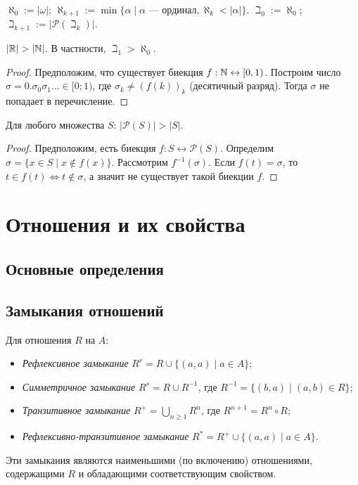 \documentclass[10pt]{article}
\begin{document}
\begin{definition}
$\aleph_0 := |\omega|$; $\aleph_{k+1} := \min\{ \alpha \mid \alpha \text{ — ординал}, \aleph_k < |\alpha| \}$.
$\beth_0 := \aleph_0$; $\beth_{k+1} := |\mathcal{P}(\beth_k)|$.
\end{definition}

\begin{theorem}
$|\mathbb{R}| > |\mathbb{N}|$. В частности, $\beth_1 > \aleph_0$.
\end{theorem}
\begin{proof}
Предположим, что существует биекция $f : \mathbb{N} \leftrightarrow [0,1)$. Построим число $\sigma = 0.\sigma_0\sigma_1\dots \in [0; 1)$, где $\sigma_k \ne (f(k))_k$ (десятичный разряд). Тогда $\sigma$ не попадает в перечисление.
\end{proof}

\begin{theorem}[Кантора]
Для любого множества $S$: $|\mathcal{P}(S)| > |S|$.
\end{theorem}
\begin{proof}
Предположим, есть биекция $f: S \leftrightarrow \mathcal{P}(S)$. Определим $\sigma = \{ x \in S \mid x \notin f(x) \}$. Рассмотрим $f^{-1}(\sigma)$. Если $f(t) = \sigma$, то $t \in f(t) \iff t \notin \sigma$, а значит не существует такой биекции $f$.
\end{proof}

\section{Отношения и их свойства}
\subsection{Основные определения}

\subsection{Замыкания отношений}
\begin{definition}
Для отношения $R$ на $A$:
\begin{itemize}
    \item \emph{Рефлексивное замыкание} $R^r = R \cup \{ (a,a) \mid a \in A \}$;
    \item \emph{Симметричное замыкание} $R^s = R \cup R^{-1}$, где $R^{-1} = \{ (b,a) \mid (a,b) \in R \}$;
    \item \emph{Транзитивное замыкание} $R^+ = \bigcup_{n \ge 1} R^n$, где $R^{n+1} = R^n \circ R$;
    \item \emph{Рефлексивно-транзитивное замыкание} $R^* = R^+ \cup \{ (a,a) \mid a \in A \}$.
\end{itemize}
\end{definition}
Эти замыкания являются наименьшими (по включению) отношениями, содержащими $R$ и обладающими соответствующим свойством.
\end{document}
